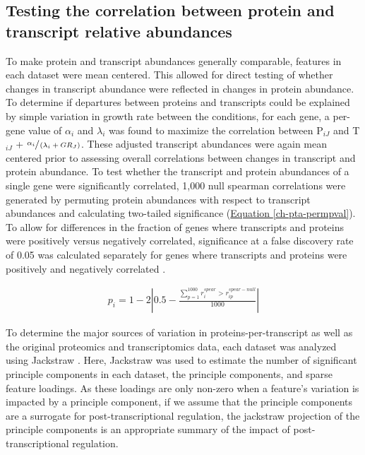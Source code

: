 \subsection*{Testing the correlation between protein and transcript relative abundances}

To make protein and transcript abundances generally comparable, features in each dataset were mean centered. This allowed for direct testing of whether changes in transcript abundance were reflected in changes in protein abundance.  To determine if departures between proteins and transcripts could be explained by simple variation in growth rate between the conditions, for each gene, a per-gene value of $\alpha_{i}$ and $\lambda_{i}$ was found to maximize  the correlation between P$_{iJ}$ and T$_{iJ}$ + $\sfrac{\alpha_{i}}{\left(\lambda_{i} + GR_{J}\right)}$.  These adjusted transcript abundances were again mean centered prior to assessing overall correlations between changes in transcript and protein abundance. To test whether the transcript and protein abundances of a single gene were significantly correlated, 1,000 null spearman correlations were generated by permuting protein abundances with respect to transcript abundances and calculating two-tailed significance (\hyperref[ch-pta-permpval]{Equation \ref{ch-pta-permpval}}). To allow for differences in the fraction of genes where transcripts and proteins were positively versus negatively correlated, significance at a false discovery rate of 0.05 was calculated separately for genes where transcripts and proteins were positively and negatively correlated \cite{Storey:2003cj}.

\begin{align}
p_{i} = 1 - 2\left|0.5 - \frac{\sum_{p = 1}^{1000}r^{spear}_{i} > r_{ip}^{spear-null}}{1000}\label{ch-pta-permpval}\right|
\end{align}

To determine the major sources of variation in proteins-per-transcript as well as the original proteomics and transcriptomics data, each dataset was analyzed using Jackstraw \cite{Chung:2015bq}. Here, Jackstraw was used to estimate the number of significant principle components in each dataset, the principle components, and sparse feature loadings. As these loadings are only non-zero when a feature's variation is impacted by a principle component, if we assume that the principle components are a surrogate for post-transcriptional regulation, the jackstraw projection of the principle components is an appropriate summary of the impact of post-transcriptional regulation.

